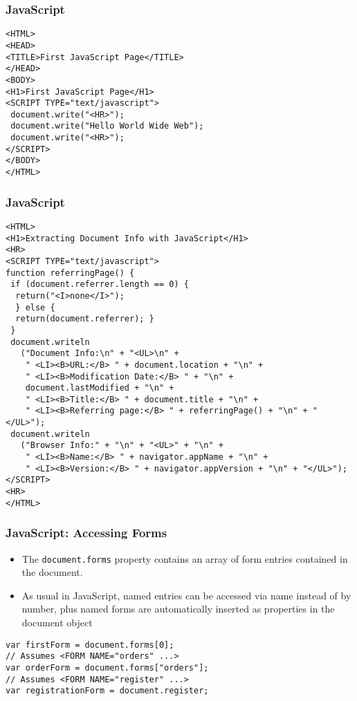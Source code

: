 \documentclass{beamer}
\begin{document}
\begin{frame}[fragile]\frametitle{JavaScript}
\begin{lstlisting}[style=htmlCode] 
<HTML>
<HEAD>
<TITLE>First JavaScript Page</TITLE>
</HEAD>
<BODY>
<H1>First JavaScript Page</H1>
<SCRIPT TYPE="text/javascript">
 document.write("<HR>");
 document.write("Hello World Wide Web");
 document.write("<HR>");
</SCRIPT>
</BODY>
</HTML>
\end{lstlisting}
\end{frame}

\begin{frame}[fragile]\frametitle{JavaScript}
\begin{lstlisting}[style=htmlCode] 
<HTML>
<H1>Extracting Document Info with JavaScript</H1>
<HR>
<SCRIPT TYPE="text/javascript">
function referringPage() {
 if (document.referrer.length == 0) {
  return("<I>none</I>");
  } else {
  return(document.referrer); }
 }
 document.writeln
   ("Document Info:\n" + "<UL>\n" +
    " <LI><B>URL:</B> " + document.location + "\n" +
    " <LI><B>Modification Date:</B> " + "\n" +
    document.lastModified + "\n" +
    " <LI><B>Title:</B> " + document.title + "\n" +
    " <LI><B>Referring page:</B> " + referringPage() + "\n" + "</UL>");
 document.writeln
   ("Browser Info:" + "\n" + "<UL>" + "\n" +
    " <LI><B>Name:</B> " + navigator.appName + "\n" +
    " <LI><B>Version:</B> " + navigator.appVersion + "\n" + "</UL>");
</SCRIPT>
<HR>
</HTML>
\end{lstlisting}
\end{frame}

\begin{frame}[fragile]\frametitle{JavaScript: Accessing Forms}

  \begin{itemize}
  \item The \lstinline|document.forms| property contains an array of
    form entries contained in the document.
  \item As usual in JavaScript, named entries can be accessed via name
    instead of by number, plus named forms are automatically inserted
    as properties in the document object
  \end{itemize}

\begin{lstlisting}[style=htmlCode] 
var firstForm = document.forms[0];
// Assumes <FORM NAME="orders" ...>
var orderForm = document.forms["orders"];
// Assumes <FORM NAME="register" ...>
var registrationForm = document.register;
\end{lstlisting}
\end{frame}
\end{document}
